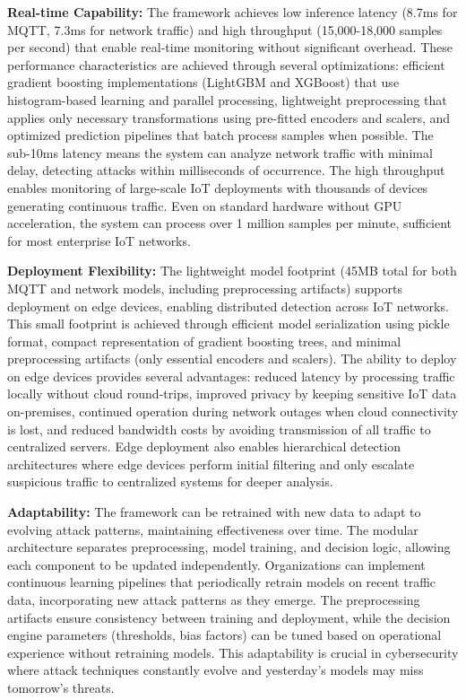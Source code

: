 \documentclass[conference]{IEEEtran}
\begin{document}
\textbf{Real-time Capability:} The framework achieves low inference latency (8.7ms for MQTT, 7.3ms for network traffic) and high throughput (15,000-18,000 samples per second) that enable real-time monitoring without significant overhead. These performance characteristics are achieved through several optimizations: efficient gradient boosting implementations (LightGBM and XGBoost) that use histogram-based learning and parallel processing, lightweight preprocessing that applies only necessary transformations using pre-fitted encoders and scalers, and optimized prediction pipelines that batch process samples when possible. The sub-10ms latency means the system can analyze network traffic with minimal delay, detecting attacks within milliseconds of occurrence. The high throughput enables monitoring of large-scale IoT deployments with thousands of devices generating continuous traffic. Even on standard hardware without GPU acceleration, the system can process over 1 million samples per minute, sufficient for most enterprise IoT networks.

\textbf{Deployment Flexibility:} The lightweight model footprint (45MB total for both MQTT and network models, including preprocessing artifacts) supports deployment on edge devices, enabling distributed detection across IoT networks. This small footprint is achieved through efficient model serialization using pickle format, compact representation of gradient boosting trees, and minimal preprocessing artifacts (only essential encoders and scalers). The ability to deploy on edge devices provides several advantages: reduced latency by processing traffic locally without cloud round-trips, improved privacy by keeping sensitive IoT data on-premises, continued operation during network outages when cloud connectivity is lost, and reduced bandwidth costs by avoiding transmission of all traffic to centralized servers. Edge deployment also enables hierarchical detection architectures where edge devices perform initial filtering and only escalate suspicious traffic to centralized systems for deeper analysis.

\textbf{Adaptability:} The framework can be retrained with new data to adapt to evolving attack patterns, maintaining effectiveness over time. The modular architecture separates preprocessing, model training, and decision logic, allowing each component to be updated independently. Organizations can implement continuous learning pipelines that periodically retrain models on recent traffic data, incorporating new attack patterns as they emerge. The preprocessing artifacts ensure consistency between training and deployment, while the decision engine parameters (thresholds, bias factors) can be tuned based on operational experience without retraining models. This adaptability is crucial in cybersecurity where attack techniques constantly evolve and yesterday's models may miss tomorrow's threats.
\end{document}
